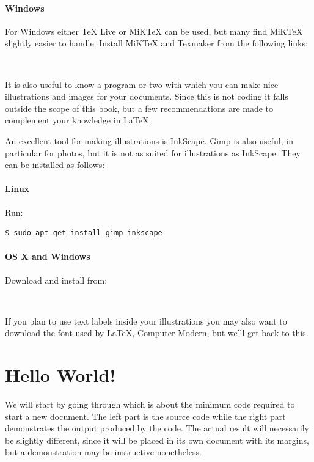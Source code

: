 \paragraph{Windows}
For Windows either TeX Live or MiKTeX can be used, but many find MiKTeX slightly easier to handle. Install MiKTeX and Texmaker from the following links:

~\\

It is also useful to know a program or two with which you can make nice illustrations and images for your documents. Since this is not coding it falls outside the scope of this book, but a few recommendations are made to complement your knowledge in \LaTeX.  

An excellent tool for making illustrations is InkScape. Gimp is also useful, in particular for photos, but it is not as suited for illustrations as InkScape. They can be installed as follows:

\paragraph{Linux} Run:
\begin{verbatim}
$ sudo apt-get install gimp inkscape
\end{verbatim}

\paragraph{OS X and Windows}
Download and install from:

~\\

If you plan to use text labels inside your illustrations you may also want to download the font used by \LaTeX{}, Computer Modern, but we'll get back to this.


\section{Hello World!}
We will start by going through  which is about the minimum code required to start a new document. The left part is the source code while the right part demonstrates the output produced by the code. The actual result will necessarily be slightly different, since it will be placed in its own document with its margins, but a demonstration may be instructive nonetheless.

